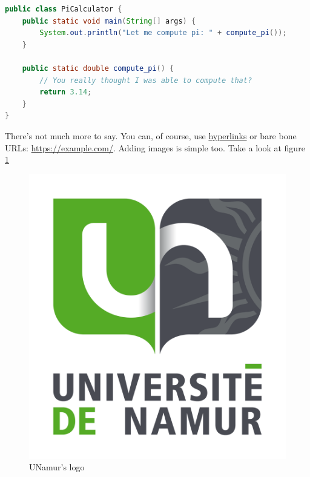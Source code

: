 \begin{lstlisting}[language=java]
public class PiCalculator {
    public static void main(String[] args) {
        System.out.println("Let me compute pi: " + compute_pi());
    }
    
    public static double compute_pi() {
        // You really thought I was able to compute that?
        return 3.14;
    }
}
\end{lstlisting}

There's not much more to say. You can, of course, use \href{https://en.wikipedia.org/wiki/Hyperlink}{hyperlinks} or bare bone URLs: \url{https://example.com/}. Adding images is simple too. Take a look at figure \ref{fig:unamur_logo}

\begin{figure}[htb]
    \centering
    \includegraphics[width=0.4\linewidth]{images/unamur.png}
    \caption{UNamur's logo}
    \label{fig:unamur_logo}
\end{figure}
